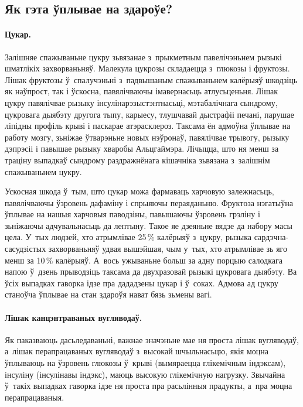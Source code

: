 \subsection{Як гэта ўплывае на здароўе?}

\paragraph{Цукар.}
Залішняе спажываньне цукру зьвязанае з~прыкметным павелічэньнем рызыкі шматлікіх захворваньняў. Малекула цукрозы складаецца з~глюкозы і фруктозы. Лішак фруктозы ў~спалучэньні з~падвышаным спажываньнем калёрыяў шкодзіць як наўпрост, так і ўскосна, павялічваючы імавернасьць атлусьценьня. Лішак цукру павялічвае рызыку інсулінарэзыстэнтнасьці, мэтабалічнага сындрому, цукровага дыябэту другога тыпу, карыесу, тлушчавай дыстрафіі печані, парушае ліпідны профіль крыві і паскарае атэрасклероз. Таксама ён адмоўна ўплывае на работу мозгу, зьніжае ўтварэньне новых нэўронаў, павялічвае трывогу, рызыку дэпрэсіі і павышае рызыку хваробы Альцгаймэра. Лічыцца, што ня менш за траціну выпадкаў сындрому раздражнёнага кішачніка зьвязана з~залішнім спажываньнем цукру.

Ускосная шкода ў~тым, што цукар можа фармаваць харчовую залежнасьць, павялічваючы ўзровень дафаміну і спрыяючы пераяданьню. Фруктоза нэгатыўна ўплывае на нашыя харчовыя паводзіны, павышаючы ўзровень грэліну і зьніжаючы адчувальнасьць да лептыну. Такое яе дзеяньне вядзе да набору масы цела. У~тых людзей, хто атрымлівае 25\,\% калёрыяў з~цукру, рызыка сардэчна-сасудзістых захворваньняў удвая вышэйшая, чым у~тых, хто атрымлівае зь яго менш за 10\,\% калёрыяў. А~вось ужываньне больш за адну порцыю салодкага напою ў~дзень прыводзіць таксама да двухразовай рызыкі цукровага дыябэту. Ва ўсіх выпадках гаворка ідзе пра дададзены цукар і ў~соках. Адмова ад цукру станоўча ўплывае на стан здароўя нават бязь зьмены вагі.


\paragraph{Лішак канцэнтраваных вугляводаў.}
Як паказваюць дасьледаваньні, важнае значэньне мае ня проста лішак вугляводаў, а~лішак перапрацаваных вугляводаў з~высокай шчыльнасьцю, якія моцна ўплываюць на ўзровень глюкозы ў~крыві (вымяраецца глікемічным індэксам), інсуліну (інсулінавы індэкс), маюць высокую глікемічную нагрузку. Звычайна ў~такіх выпадках гаворка ідзе ня проста пра расьлінныя прадукты, а~пра моцна перапрацаваныя.


